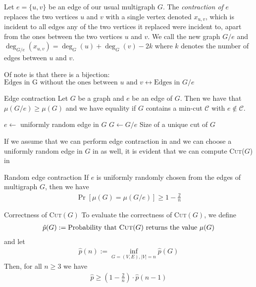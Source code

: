 Let $e = \{u, v\}$ be an edge of our usual multigraph $G$.
The \textit{contraction of} $e$ replaces the two vertices $u$ and $v$ with a single vertex denoted $x_{u, v}$, which is incident to all edges any of the two vertices it replaced were incident to, apart from the ones between the two vertices $u$ and $v$.
We call the new graph $G/e$ and $\deg_{G/e}(x_{u, v}) = \deg_G(u) + \deg_G(v) - 2k$ where $k$ denotes the number of edges between $u$ and $v$.

Of note is that there is a bijection: $\text{Edges in G without the ones between $u$ and } v \leftrightarrow \text{Edges in $G/e$}$

\begin{lemma}[]{Edge contraction}
    Let $G$ be a graph and $e$ be an edge of $G$. Then we have that $\mu(G/e) \geq \mu(G)$ and we have equality if $G$ contains a min-cut $\mathcal{C}$ with $e \notin \mathcal{C}$.
\end{lemma}



\begin{algorithm}
    \caption{Random Cut where $G$ is a connected Multigraph}
    \begin{algorithmic}[1]
             
                \State $e \gets$ uniformly random edge in $G$
                \State $G \gets G/e$
            \EndWhile
            \State \Return Size of a unique cut of $G$
        \EndProcedure
    \end{algorithmic}
\end{algorithm}

If we assume that we can perform edge contraction in  and we can choose a uniformly random edge in $G$ in  as well, it is evident that we can compute \textsc{Cut}($G$) in 

\begin{lemma}[]{Random edge contraction}
    If $e$ is uniformly randomly chosen from the edges of multigraph $G$, then we have
    \begin{align*}
        \Pr[\mu(G) = \mu(G/e)] \geq 1 - \frac{2}{n}
    \end{align*}
\end{lemma}

\newpage
\begin{lemma}[]{Correctness of \textsc{Cut}$(G)$}
    To evaluate the correctness of \textsc{Cut}$(G)$, we define
    \begin{align*}
        \hat{p}(G) := \text{Probability that \textsc{Cut}($G$) returns the value } \mu(G)
    \end{align*}
    and let
    \begin{align*}
        \hat{p}(n) := \inf_{G=(V, E), |V| = n}\hat{p}(G)
    \end{align*}
    Then, for all $n \geq 3$ we have
    \begin{align*}
        \hat{p} \geq \left( 1 - \frac{2}{n} \right) \cdot \hat{p}(n - 1)
    \end{align*}
\end{lemma}

